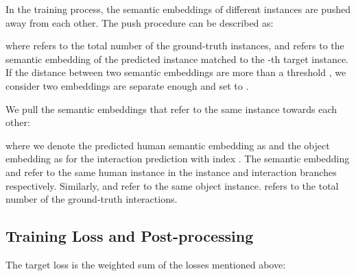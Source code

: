 \documentclass[final]{cvpr}
\begin{document}
In the training process, the semantic embeddings of different instances are pushed away from each other. The push procedure can be described as:

where  refers to the total number of the ground-truth instances, and  refers to the semantic embedding of the predicted instance matched to the -th target instance. If the  distance between two semantic embeddings are more than a threshold , we consider two embeddings are separate enough and set  to .

We pull the semantic embeddings that refer to the same instance towards each other:
 
where we denote the predicted human semantic embedding as  and the object embedding as  for the interaction prediction with index . The semantic embedding  and  refer to the same human instance in the instance and interaction branches respectively. Similarly,  and  refer to the same object instance.  refers to the total number of the ground-truth interactions.


\vspace{-1.5mm}\subsection{Training Loss and Post-processing} \label{sec:training and postprocess}\vspace{-1mm}
The target loss is the weighted sum of the losses mentioned above:
\vspace{-1mm}
 
\end{document}
